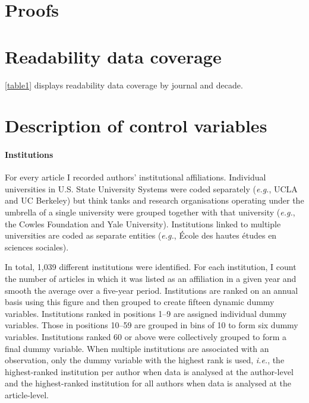 \clearpage
\begin{appendices}
\begin{refsection}


\section{Proofs}
\label{appendixproofs}



\clearpage


\section{Readability data coverage}
\label{appendixarticlecount}

\autoref{table1} displays readability data coverage by journal and decade.



\clearpage


\section{Description of control variables}
\label{appendixcontrols}

\paragraph{Institutions}
\label{appendixcontrolsinstitutions}

For every article I recorded authors' institutional affiliations. Individual universities in U.S. State University Systems were coded separately (\emph{e.g.}, UCLA and UC Berkeley) but think tanks and research organisations operating under the umbrella of a single university were grouped together with that university (\emph{e.g.}, the Cowles Foundation and Yale University). Institutions linked to multiple universities are coded as separate entities (\emph{e.g.}, École des hautes études en sciences sociales).

In total, 1,039 different institutions were identified. For each institution, I count the number of articles in which it was listed as an affiliation in a given year and smooth the average over a five-year period. Institutions are ranked on an annual basis using this figure and then grouped to create fifteen dynamic dummy variables. Institutions ranked in positions 1--9 are assigned individual dummy variables. Those in positions 10--59 are grouped in bins of 10 to form six dummy variables. Institutions ranked 60 or above were collectively grouped to form a final dummy variable. When multiple institutions are associated with an observation, only the dummy variable with the highest rank is used, \emph{i.e.}, the highest-ranked institution per author when data is analysed at the author-level and the highest-ranked institution for all authors when data is analysed at the article-level.


\end{refsection}
\end{appendices}
